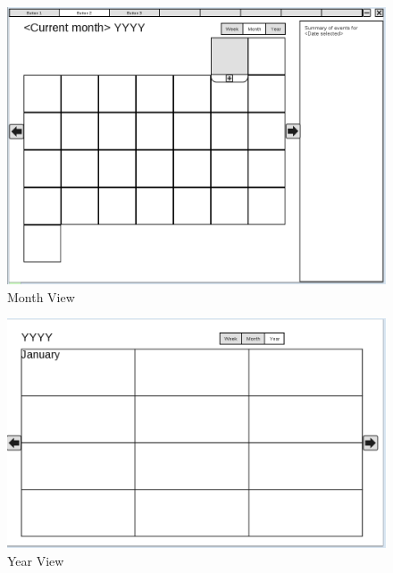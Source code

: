 \documentclass{article}
\begin{document}
\begin{figure}
\centering
\includegraphics[scale=0.5,angle=90]{CMCLGDRMonth.png}
\caption{Month View}
\label{fig:monthview}
\end{figure}

\begin{figure}
\centering
\includegraphics[scale=0.5,angle=90]{CMCLGDRYear.png}
\caption{Year View}
\label{fig:yearrview}
\end{figure}
\end{document}
